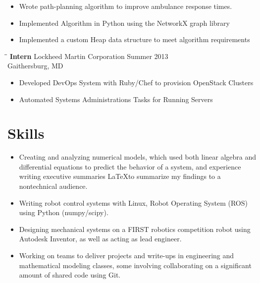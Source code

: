 \documentclass[12pt]{res}
\begin{document}
\begin{resume}
	\vspace{-40pt}
	\begin{itemize}
	\item Wrote path-planning algorithm to improve ambulance response times.
	\vspace{-10pt}
	\item Implemented Algorithm in Python using the NetworkX graph library
	\vspace{-10pt}
	\item Implemented a custom Heap data structure to meet algorithm requirements
	\end{itemize}
    
    \begin{tabbing}
    \hspace{2.3in}\= \hspace{2.6in}\= \kill %
    \textbf{ Intern } \> Lockheed Martin Corporation \> Summer 2013\\
                  \> Gaithersburg, MD
    \end{tabbing}\vspace{-10pt}

	\vspace{-15pt}
	\begin{itemize}
	\item Developed DevOps System with Ruby/Chef to provision 
		OpenStack Clusters
	\vspace{-10pt} 
	\item Automated Systems Administrations Tasks for Running Servers
	\end{itemize}

  \section{Skills}
	\noindent
	\begin{itemize}
	\item Creating and analyzing numerical models, which used both 
		linear algebra and differential equations to predict the behavior of a system, 
		and experience writing executive summaries \LaTeX to summarize my findings to a nontechnical audience.
	\item Writing robot control systems with Linux, Robot Operating System
		(ROS) using Python (numpy/scipy).
	\item Designing mechanical systems on a FIRST robotics
		competition robot using Autodesk Inventor, 
		as well as acting as lead engineer.
	\item Working on teams to deliver projects and write-ups
		in engineering and mathematical modeling classes,
		some involving collaborating on a significant amount of shared
		code using Git.
	\end{itemize}


\end{resume}
\end{document}
